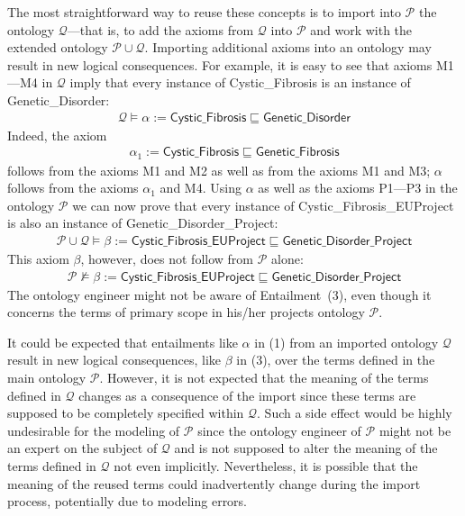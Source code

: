 \documentclass[12pt,a4paper]{article}
\newenvironment{problems}[2][{\color{purple}Question}]{\begin{trivlist}
\item[\hskip \labelsep {\bfseries #1}\hskip \labelsep {\bfseries #2.}]}{\end{trivlist}}
\begin{document}
\begin{problems}{{\color{purple}6 (with 1 bonus mark)}}
The most straightforward way to reuse these concepts is to import into $\mathcal{P}$ the ontology $\mathcal{Q}$---that is, to add the axioms from $\mathcal{Q}$ into $\mathcal{P}$ and work with the extended ontology $\mathcal{P}\cup\mathcal{Q}$. Importing additional axioms into an ontology may result in new logical consequences. For example, it is easy to see that axioms \textsf{M1---M4} in $\mathcal{Q}$ imply that every instance of \textsf{Cystic\_Fibrosis} is an instance of \textsf{Genetic\_Disorder}:
\begin{align}
\mathcal{Q}\models\alpha:=\textsf{Cystic\_Fibrosis}\sqsubseteq\textsf{Genetic\_Disorder}
\end{align}
Indeed, the axiom
\begin{align}
\alpha_{1}:=\textsf{Cystic\_Fibrosis}\sqsubseteq\textsf{Genetic\_Fibrosis}
\end{align}follows from the axioms \textsf{M1} and \textsf{M2} as well as from the axioms \textsf{M1} and \textsf{M3}; $\alpha$ follows from the axioms $\alpha_{1}$ and \textsf{M4}. Using $\alpha$ as well as the axioms \textsf{P1---P3} in the ontology $\mathcal{P}$ we can now prove that every instance of \textsf{Cystic\_Fibrosis\_EUProject} is also an instance of \textsf{Genetic\_Disorder\_Project}:
\begin{align}
\mathcal{P}\cup\mathcal{Q}\models\beta:=\textsf{Cystic\_Fibrosis\_EUProject}\sqsubseteq\textsf{Genetic\_Disorder\_Project}
\label{axiom3}
\end{align}This axiom $\beta$, however, does not follow from $\mathcal{P}$ alone: \begin{align}\mathcal{P}\not\models\beta:=\textsf{Cystic\_Fibrosis\_EUProject}\sqsubseteq\textsf{Genetic\_Disorder\_Project}\end{align}The ontology engineer might not be aware of Entailment~(3), even though it concerns the terms of primary scope in his/her projects ontology $\mathcal{P}$.

It could be expected that entailments like $\alpha$ in (1) from an imported ontology $\mathcal{Q}$ result in new logical consequences, like $\beta$ in (3), over the terms defined in the main ontology $\mathcal{P}$. However, it is not expected that the meaning of the terms defined in $\mathcal{Q}$ changes as a consequence of the import since these terms are supposed to be completely specified within $\mathcal{Q}$. Such a side effect would be highly undesirable for the modeling of $\mathcal{P}$ since the ontology engineer of $\mathcal{P}$ might not be an expert on the subject of $\mathcal{Q}$ and is not supposed to alter the meaning of the terms defined in $\mathcal{Q}$ not even implicitly. Nevertheless, it is possible that the meaning of the reused terms could inadvertently change during the import process, potentially due to modeling errors.


\end{problems}
\end{document}
